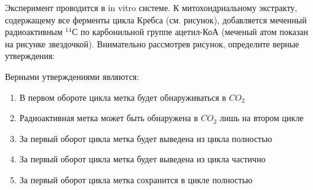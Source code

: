 
Эксперимент проводится в in vitro системе. К митохондриальному
экстракту, содержащему все ферменты цикла Кребса (см. рисунок),  добавляется меченный радиоактивным $^{14}$С
по карбонильной группе ацетил-КоА (меченый атом показан на рисунке
звездочкой). Внимательно рассмотрев рисунок, определите верные утверждения:


Верными утверждениями являются:

\begin{enumerate}
    \item В первом обороте цикла метка будет обнаруживаться в $CO_2$
    \item Радиоактивная метка может быть обнаружена в $CO_2$ лишь на втором цикле
    \item За первый оборот цикла метка будет выведена из цикла полностью
    \item За первый оборот цикла метка будет выведена из цикла частично
    \item За первый оборот цикла метка сохранится в цикле полностью
\end{enumerate}

\explanationSection

